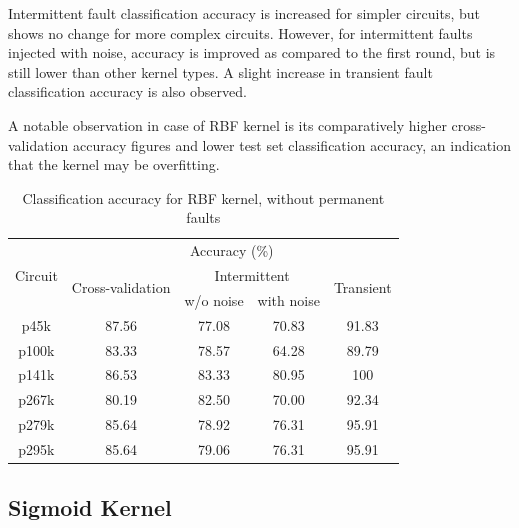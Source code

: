 Intermittent fault classification accuracy is increased for simpler circuits, but shows no change for more complex circuits. However, for intermittent faults injected with noise, accuracy is improved as compared to the first round, but is still lower than other kernel types. A slight increase in transient fault classification accuracy is also observed. 

A notable observation in case of RBF kernel is its comparatively higher cross-validation accuracy figures and lower test set classification accuracy, an indication that the kernel may be overfitting.

\begin{table}[h]
	\captionsetup{justification=centering}
\begin{tabular}{ccccc}
\hline
\multirow{3}{*}{Circuit} & \multicolumn{4}{c}{Accuracy (\%)}                                                                 \\ \cline{2-5} 
                         & \multirow{2}{*}{Cross-validation} & \multicolumn{2}{c}{Intermittent} & \multirow{2}{*}{Transient} \\ \cline{3-4}
                         &                                   & w/o noise      & with noise      &                            \\ \hline
p45k                     & 87.56                             & 77.08          & 70.83           & 91.83                      \\
p100k                    & 83.33                             & 78.57          & 64.28           & 89.79                      \\
p141k                    & 86.53                             & 83.33          & 80.95           & 100                        \\
p267k                    & 80.19                             & 82.50          & 70.00           & 92.34                      \\
p279k                    & 85.64                             & 78.92          & 76.31           & 95.91                      \\
p295k                    & 85.64                             & 79.06          & 76.31           & 95.91  						  \\
\hline
\end{tabular}
\caption {Classification accuracy for RBF kernel, without permanent faults}
\label{tab:rbfwop}
\end{table}

\subsection{Sigmoid Kernel}

